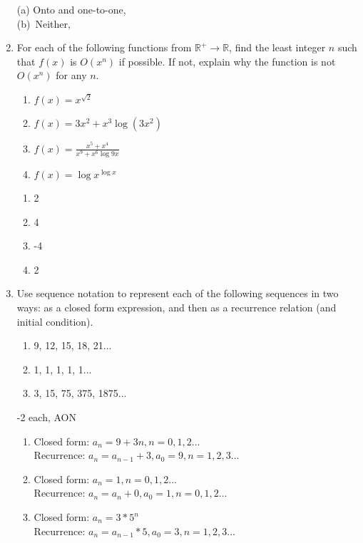 \begin{enumerate}
\begin{solution}
    (a) Onto and one-to-one,  \rightarrow {}\\
    (b)\ Neither,  \rightarrow {}

\end{solution}

\item For each of the following functions from $\mathbb{R}^+ \rightarrow \mathbb{R}$, find the least integer $n$ such that $f(x)$ is $O(x^n)$ if possible. If not, explain why the function is not $O(x^n)$ for any $n$. 

\begin{enumerate}
    \item $f(x) = x^{\sqrt{2}}$
    \item $f(x) = 3x^2 + x^3\log(3x^2)$
    \item $f(x) = \frac{x^5 + x^4}{x^9 + x^6\log9x}$
    \item $f(x) = \log x^{\log x}$
\end{enumerate}

\begin{solution}
\begin{enumerate}
    \item 2
    \item 4
    \item -4
    \item 2
\end{enumerate}
\end{solution}

\item Use sequence notation to represent each of the following sequences in two ways: as a closed form expression, and then as a recurrence relation (and initial condition). 

\begin{enumerate}
    \item 9, 12, 15, 18, 21...
    \item 1, 1, 1, 1, 1...
    \item 3, 15, 75, 375, 1875...
\end{enumerate}

\begin{rubric}
    -2 each, AON
\end{rubric}

\begin{solution}
\begin{enumerate}
    \item Closed form: $a_{n}=9+3n, n=0,1,2...$\\ Recurrence: $a_{n}=a_{n-1}+3, a_{0}=9, n=1,2,3...$
    \item Closed form: $a_{n} = 1, n=0,1,2...$\\ Recurrence: $a_{n}=a_{n}+0, a_{0}=1,n=0,1,2...$
    \item Closed form: $a_{n}=3*5^{n}$\\ Recurrence: $a_{n}=a_{n-1}*5, a_{0}=3, n=1,2,3...$
\end{enumerate}
\end{solution}


\end{enumerate}

